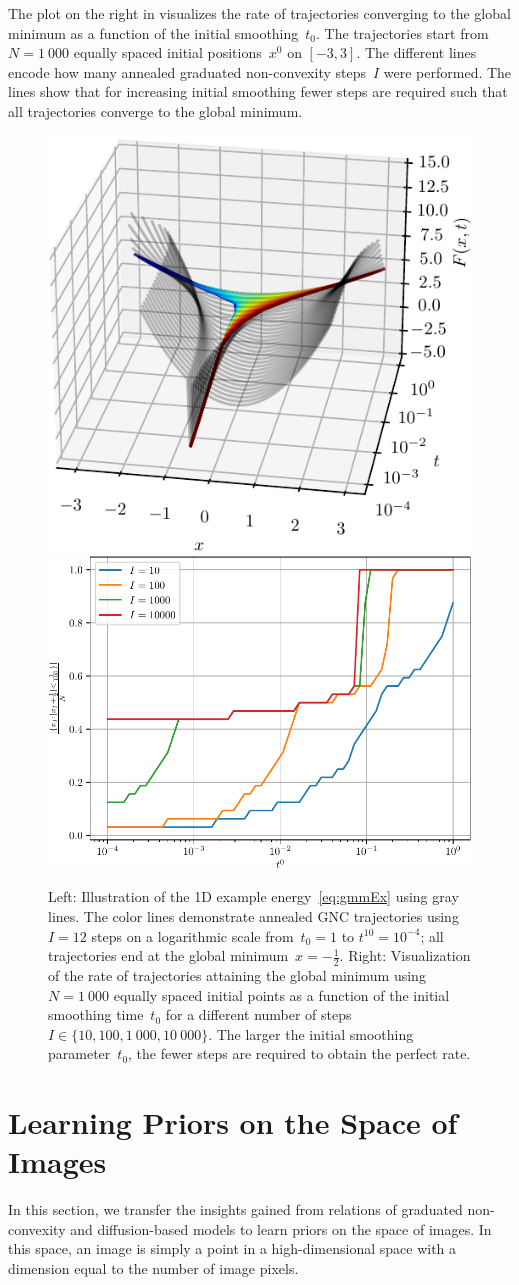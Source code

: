 \documentclass[nohyperref]{article}
\theoremstyle{plain}
\theoremstyle{definition}
\theoremstyle{remark}
\begin{document}
The plot on the right in  visualizes the rate of trajectories converging to the global minimum as a function of the initial smoothing~$t_0$.
The trajectories start from~$N=1\ 000$ equally spaced initial positions~$x^0$ on $[-3,3]$.
The different lines encode how many annealed graduated non-convexity steps~$I$ were performed.
The lines show that for increasing initial smoothing fewer steps are required such that all trajectories converge to the global minimum.
\begin{figure}[t]
\hfill\includegraphics[width=.4\linewidth]{./figures/ex_gmm/ex_gmm_opt}\hfill
\includegraphics[width=.5\linewidth]{./figures/ex_gmm/ex_gmm_acc}\hfill
\label{fig:gmmOptimization}
\caption{Left: Illustration of the 1D example energy~\eqref{eq:gmmEx} using gray lines. The color lines demonstrate annealed GNC trajectories using $I=12$ steps on a logarithmic scale from~$t_0=1$ to $t^{10}=10^{-4}$; all trajectories end at the global minimum~$x=-\frac12$.
Right: Visualization of the rate of trajectories attaining the global minimum using~$N=1\ 000$ equally spaced initial points as a function of the initial smoothing time~$t_0$ for a different number of steps~$I\in\{10,100,1\ 000,10\ 000\}$.
The larger the initial smoothing parameter~$t_0$, the fewer steps are required to obtain the perfect rate.
}
\end{figure}

\section{Learning Priors on the Space of Images}
In this section, we transfer the insights gained from relations of graduated non-convexity and diffusion-based models to learn priors on the space of images.
In this space, an image is simply a point in a high-dimensional space with a dimension equal to the number of image pixels.
\end{document}
